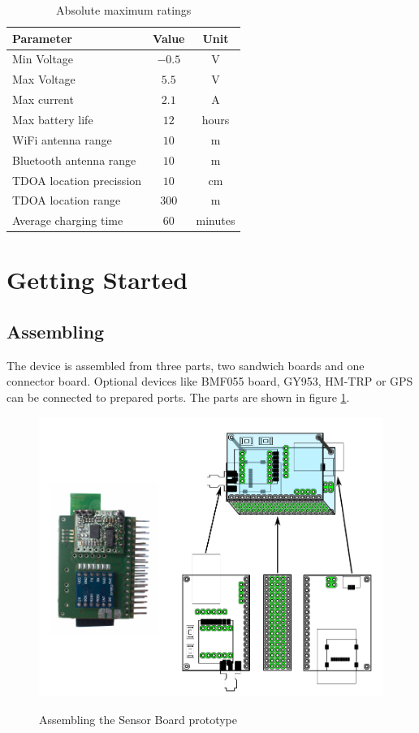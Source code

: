 \begin{table}[H]
	\centering
	\begin{tabular}{|l|c|c|}
		\hline
		Parameter & Value & Unit \\
		\hline \hline
		Min Voltage & $-0.5$ & V \\
		Max Voltage & $5.5$ & V \\
		Max current & $2.1$ & A \\
		Max battery life & $12$ & hours \\
		WiFi antenna range & $10$ & m \\
		Bluetooth antenna range & $10$ & m \\
		TDOA location precission & $10$ & cm \\
		TDOA location range & $300$ & m \\
		Average charging time & $60$ & minutes \\
		\hline
	\end{tabular}
	\caption{Absolute maximum ratings}
	\label{HWmaxRatings}
\end{table}

\section{Getting Started}

\subsection{Assembling}
The device is assembled from three parts, two sandwich boards and one connector board. Optional devices like BMF055 board, GY953, HM-TRP or GPS can be connected to prepared ports. The parts are shown in figure \ref{HWassembling}.

\begin{figure}[H]
	\centering
	\includegraphics[scale=1]{img/assemblingHW.pdf}
	\label{HWassembling}
	\caption{Assembling the Sensor Board prototype}
\end{figure}

